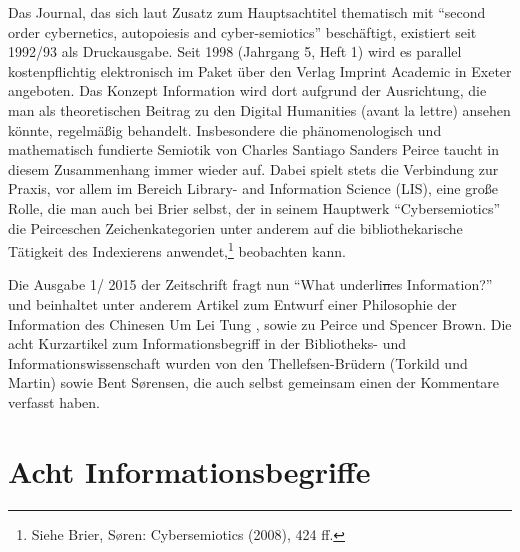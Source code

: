 \documentclass[a4paper,
fontsize=11pt,
oneside,
numbers=noperiodatend,
parskip=half-,
bibliography=totoc,
final
]{scrartcl}
\begin{document}
Das Journal, das sich laut Zusatz zum Hauptsachtitel thematisch mit
\enquote{second order cybernetics, autopoiesis and cyber-semiotics}
beschäftigt, existiert seit 1992/93 als Druckausgabe. Seit 1998
(Jahrgang 5, Heft 1) wird es parallel kostenpflichtig elektronisch im
Paket über den Verlag Imprint Academic in Exeter angeboten. Das Konzept
Information wird dort aufgrund der Ausrichtung, die man als
theoretischen Beitrag zu den Digital Humanities (avant la lettre)
ansehen könnte, regelmäßig behandelt. Insbesondere die phänomenologisch
und mathematisch fundierte Semiotik von Charles Santiago Sanders Peirce
taucht in diesem Zusammenhang immer wieder auf. Dabei spielt stets die
Verbindung zur Praxis, vor allem im Bereich Library- and Information
Science (LIS), eine große Rolle, die man auch bei Brier selbst, der in
seinem Hauptwerk \enquote{Cybersemiotics} die Peirceschen
Zeichenkategorien unter anderem auf die bibliothekarische Tätigkeit des
Indexierens anwendet,\footnote{Siehe Brier, Søren: Cybersemiotics
  (2008), 424 ff.} beobachten kann.

Die Ausgabe 1/ 2015 der Zeitschrift fragt nun \enquote{What
underli\sout{n}es Information?} und beinhaltet unter anderem Artikel zum
Entwurf einer Philosophie der Information des Chinesen Um Lei Tung ,
sowie zu Peirce und Spencer Brown. Die acht Kurzartikel zum
Informationsbegriff in der Bibliotheks- und Informationswissenschaft
wurden von den Thellefsen-Brüdern (Torkild und Martin) sowie Bent
Sørensen, die auch selbst gemeinsam einen der Kommentare verfasst haben.

\section*{Acht
Informationsbegriffe}\label{acht-informationsbegriffe}
\end{document}
